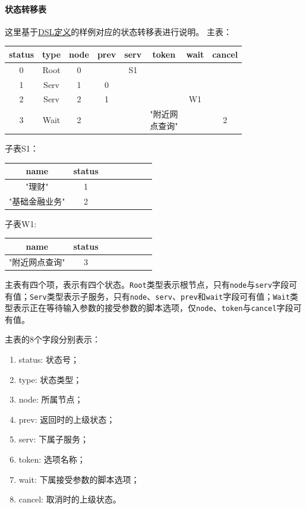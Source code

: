\documentclass[hyperref]{ctexart}
\begin{document}
\paragraph{状态转移表}
这里基于\href{DSL Def}{DSL定义}的样例对应的状态转移表进行说明。
主表：
\begin{center}        
\begin{tabular}{|c|c|c|c|c|c|c|c|}%
    \hline
    status & type & node & prev & serv & token & wait & cancel \\
    \hline
    0 & Root & 0 & & S1 & & & \\
    \hline
    1 & Serv & 1 & 0 & & & & \\
    \hline
    2 & Serv & 2 & 1 & & & W1 & \\
    \hline
    3 & Wait & 2 & & & \makecell*[c]{"附近网\\点查询"} & & 2 \\
    \hline
\end{tabular}
\end{center}
子表S1：
\begin{center}        
\begin{tabular}{|c|c|c|c|c|c|c|c|}%
    \hline
    name & status \\
    \hline
    "理财" & 1 \\
    \hline
    "基础金融业务" & 2 \\
    \hline
\end{tabular}
\end{center}
子表W1:
\begin{center}        
\begin{tabular}{|c|c|c|c|c|c|c|c|}%
    \hline
    name & status \\
    \hline
    "附近网点查询" & 3 \\
    \hline
\end{tabular}
\end{center}
主表有四个项，表示有四个状态。\texttt{Root}类型表示根节点，只有\texttt{node}与\texttt{serv}字段可有值；\texttt{Serv}类型表示子服务，只有\texttt{node}、\texttt{serv}、\texttt{prev}和\texttt{wait}字段可有值；\texttt{Wait}类型表示正在等待输入参数的接受参数的脚本选项，仅\texttt{node}、\texttt{token}与\texttt{cancel}字段可有值。
\par 主表的8个字段分别表示：
\begin{enumerate}
    \item status: 状态号；
    \item type: 状态类型；
    \item node: 所属节点；
    \item prev: 返回时的上级状态；
    \item serv: 下属子服务；
    \item token: 选项名称；
    \item wait: 下属接受参数的脚本选项；
    \item cancel: 取消时的上级状态。
\end{enumerate}
\end{document}
